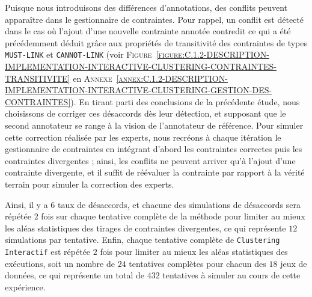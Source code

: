 			Puisque nous introduisons des différences d'annotations, des conflits peuvent apparaître dans le gestionnaire de contraintes.
			Pour rappel, un conflit est détecté dans le cas où l'ajout d'une nouvelle contrainte annotée contredit ce qui a été précédemment déduit grâce aux propriétés de transitivité des contraintes de types \texttt{MUST-LINK} et \texttt{CANNOT-LINK} (voir \textsc{Figure~\ref{figure:C.1.2-DESCRIPTION-IMPLEMENTATION-INTERACTIVE-CLUSTERING-CONTRAINTES-TRANSITIVITE}} en \textsc{Annexe~\ref{annex:C.1.2-DESCRIPTION-IMPLEMENTATION-INTERACTIVE-CLUSTERING-GESTION-DES-CONTRAINTES}}).
			En tirant parti des conclusions de la précédente étude, nous choisissons de corriger ces désaccords dès leur détection, et supposant que le second annotateur se range à la vision de l'annotateur de référence.
			Pour simuler cette correction réalisée par les experts, nous recréons à chaque itération le gestionnaire de contraintes en intégrant d'abord les contraintes correctes puis les contraintes divergentes ; ainsi, les conflits ne peuvent arriver qu'à l'ajout d'une contrainte divergente, et il suffit de réévaluer la contrainte par rapport à la vérité terrain pour simuler la correction des experts.
			
			Ainsi, il y a $6$ taux de désaccords, et chacune des simulations de désaccords sera répétée $2$ fois sur chaque tentative complète de la méthode pour limiter au mieux les aléas statistiques des tirages de contraintes divergentes, ce qui représente $12$ simulations par tentative.
			Enfin, chaque tentative complète de \texttt{Clustering Interactif} est répétée $2$ fois pour limiter au mieux les aléas statistiques des exécutions, soit un nombre de $24$ tentatives complètes pour chacun des $18$ jeux de données, ce qui représente un total de $432$ tentatives à simuler au cours de cette expérience.
			
